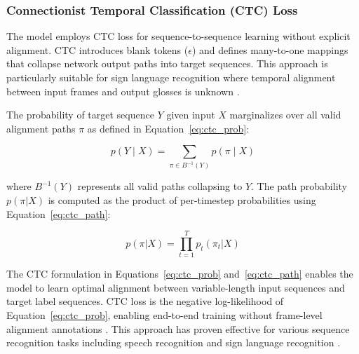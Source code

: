 \subsubsection{Connectionist Temporal Classification (CTC) Loss}

The model employs CTC loss \cite{graves2006connectionist} for sequence-to-sequence learning without explicit alignment. CTC introduces blank tokens ($\epsilon$) and defines many-to-one mappings that collapse network output paths into target sequences. This approach is particularly suitable for sign language recognition where temporal alignment between input frames and output glosses is unknown \cite{pu2019iterative}.

The probability of target sequence $Y$ given input $X$ marginalizes over all valid alignment paths $\pi$ as defined in Equation~\ref{eq:ctc_prob}:

\begin{equation}
p(Y \mid X) = \sum_{\pi \in B^{-1}(Y)} p(\pi \mid X)
\label{eq:ctc_prob}
\end{equation}

where $B^{-1}(Y)$ represents all valid paths collapsing to $Y$. The path probability $p(\pi|X)$ is computed as the product of per-timestep probabilities using Equation~\ref{eq:ctc_path}:

\begin{equation}
p(\pi | X) = \prod_{t=1}^{T} p_{t}(\pi_{t} | X)
\label{eq:ctc_path}
\end{equation}

The CTC formulation in Equations~\ref{eq:ctc_prob} and~\ref{eq:ctc_path} enables the model to learn optimal alignment between variable-length input sequences and target label sequences. CTC loss is the negative log-likelihood of Equation~\ref{eq:ctc_prob}, enabling end-to-end training without frame-level alignment annotations \cite{graves2006connectionist}. This approach has proven effective for various sequence recognition tasks including speech recognition \cite{gulati2020conformer} and sign language recognition \cite{pu2019iterative}.

 